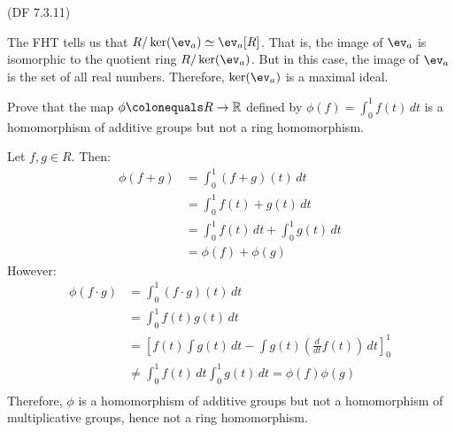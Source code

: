 \begin{problem}{(\textsf{DF 7.3.11})}
\begin{enumalph}
\begin{Answer}
        \noindent
        The FHT tells us that $R / \ker(\ev_a) \simeq \ev_a [R]$.
        That is, the image of $\ev_a$ is isomorphic to the quotient ring
        $R / \ker(\ev_a)$. But in this case, the image of $\ev_a$
        is the set of all real numbers.
        Therefore, $\ker(\ev_a)$ is a maximal ideal.
      \end{Answer}


    \newpage 
    \item Prove that the map $\phi \colonequals R \to \R$ defined by $\phi(f)=\int_0^1 
      f(t)\,dt$ is a homomorphism of additive groups but not a ring homomorphism.
      \begin{Answer}
        Let $f,g \in R$.  Then:
        \begin{align*}
          \phi(f+g) &= \int_0^1 (f+g)(t)\,dt \\
          &= \int_0^1 f(t)+g(t)\,dt \\
          &= \int_0^1 f(t)\,dt + \int_0^1 g(t)\,dt \\
          &= \phi(f) + \phi(g)
        \end{align*}
        However:
        \begin{align*}
          \phi(f\cdot g) &= \int_0^1 (f\cdot g)(t)\,dt \\
          &= \int_0^1 f(t)g(t)\,dt \\
          &= \left [ f(t) \int g(t)\, dt - \int g(t) \left (\frac{d}{dt} f(t)\right ) \,dt \right ]_0^1 \\
          &\neq \int_0^1 f(t)\,dt \int_0^1 g(t)\,dt = \phi(f)\phi(g)\\
        \end{align*}
        Therefore, $\phi$ is a homomorphism of additive groups
        but not a homomorphism of multiplicative groups, hence not a ring homomorphism.
      \end{Answer}
  \end{enumalph}
\end{problem}
